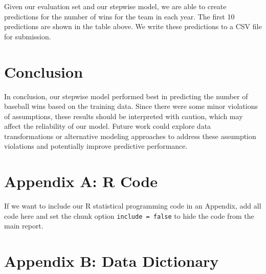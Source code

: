 \documentclass[
  11pt]{article}
\begin{document}
Given our evaluation set and our stepwise model, we are able to create
predictions for the number of wins for the team in each year. The first
10 predictions are shown in the table above. We write these predictions
to a CSV file for submission.

\section{Conclusion}\label{conclusion}

In conclusion, our stepwise model performed best in predicting the
number of baseball wins based on the training data. Since there were
some minor violations of assumptions, these results should be
interpreted with caution, which may affect the reliability of our model.
Future work could explore data transformations or alternative modeling
approaches to address these assumption violations and potentially
improve predictive performance.

\section{Appendix A: R Code}\label{appendix-a-r-code}

\begin{tcolorbox}[enhanced jigsaw, titlerule=0mm, title=\textcolor{quarto-callout-note-color}{\faInfo}\hspace{0.5em}{Note}, toptitle=1mm, colframe=quarto-callout-note-color-frame, colback=white, coltitle=black, opacityback=0, bottomtitle=1mm, opacitybacktitle=0.6, leftrule=.75mm, rightrule=.15mm, colbacktitle=quarto-callout-note-color!10!white, arc=.35mm, toprule=.15mm, left=2mm, breakable, bottomrule=.15mm]

If we want to include our R statistical programming code in an Appendix,
add all code here and set the chunk option \texttt{include\ =\ false} to
hide the code from the main report.

\end{tcolorbox}

\section{Appendix B: Data Dictionary}\label{appendix-b-data-dictionary}
\end{document}
